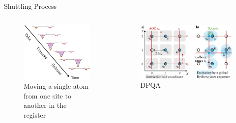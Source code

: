 \documentclass{beamer}
\begin{document}
\begin{frame}{Shuttling Process}
    \begin{columns}
        \begin{column}{.48\textwidth}
            \begin{figure}
                \includegraphics[width=.8\textwidth]{images/rearrange.png}
                \caption{Moving a single atom from one site to another in the register}
            \end{figure}
        \end{column}
        \begin{column}{.48\textwidth}
            \begin{figure}
                \includegraphics[width=.8\textwidth]{images/dpqa.png}
                \caption{DPQA}
            \end{figure}
        \end{column}
    \end{columns}
\end{frame}
\end{document}
